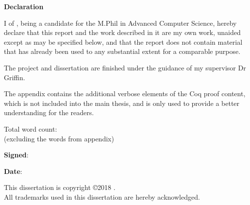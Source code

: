 \newpage
{\Huge \bf Declaration}

\vspace{24pt} 

I \authorname of \authorcollege, being a candidate for the M.Phil in
Advanced Computer Science, hereby declare that this report and the
work described in it are my own work, unaided except as may be
specified below, and that the report does not contain material that
has already been used to any substantial extent for a comparable
purpose.

The project and dissertation are finished under the guidance of my supervisor Dr Griffin.

The appendix contains the additional verbose elements of the Coq proof content, which is not included into the main thesis, and is only used to provide a better understanding for the readers.

\vspace{24pt}
Total word count: \wordcount \\
(excluding the words from appendix)

\vspace{60pt}
\textbf{Signed}: 

\vspace{12pt}
\textbf{Date}:


\vfill

This dissertation is copyright \copyright 2018 \authorname. 
\\
All trademarks used in this dissertation are hereby acknowledged.



\newpage
\vspace*{\fill}
